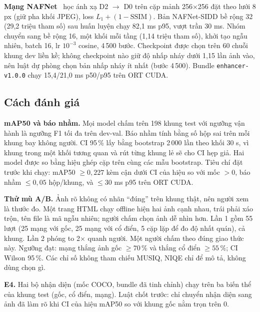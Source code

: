 \textbf{Mạng NAFNet}~\cite{nafnet} học ánh xạ D2 $\to$ D0 trên cặp mảnh 256$\times$256 đặt theo lưới 8 px (giữ pha khối JPEG), loss $L_1 + (1-\mathrm{SSIM})$. Bản NAFNet-SIDD bề rộng 32 (29,2 triệu tham số) sau huấn luyện chạy 82,1 ms p95, vượt trần 30 ms. Nhóm chuyển sang bề rộng 16, một khối mỗi tầng (1,14 triệu tham số), khởi tạo ngẫu nhiên, batch 16, lr $10^{-3}$ cosine, 4\,500 bước. Checkpoint được chọn trên 60 chuỗi khung dev liền kề; không checkpoint nào giữ độ nhấp nháy dưới 1,15 lần ảnh vào, nên luật dự phòng chọn bản nhấp nháy ít nhất (bước 4\,500). Bundle \texttt{enhancer-v1.0.0} chạy 15,4/21,0 ms p50/p95 trên ORT CUDA.

\subsection{Cách đánh giá}

\textbf{mAP50 và báo nhầm.} Mọi model chấm trên 198 khung test với ngưỡng vận hành là ngưỡng F1 tối đa trên dev-val. Báo nhầm tính bằng số hộp sai trên mỗi khung bay không người. CI 95\,\% lấy bằng bootstrap 2\,000 lần theo khối 30 s, vì khung trong một khối tương quan và rút từng khung lẻ sẽ cho CI hẹp giả. Hai model được so bằng hiệu ghép cặp trên cùng các mẫu bootstrap. Tiêu chí đặt trước khi chạy: mAP50 $\geq 0{,}227$ kèm cận dưới CI của hiệu so với mốc $>0$, báo nhầm $\leq 0{,}05$ hộp/khung, và $\leq 30$ ms p95 trên ORT CUDA.

\textbf{Thử mù A/B.} Ảnh rõ không có nhãn ``đúng'' trên khung thật, nên người xem là thước đo. Một trang HTML chạy offline hiện hai ảnh cạnh nhau, trái phải xáo trộn, tên file là mã ngẫu nhiên; người chấm chọn ảnh dễ nhìn hơn. Lần 1 gồm 55 lượt (25 mạng với gốc, 25 mạng với cổ điển, 5 cặp lặp để đo độ nhất quán), cả khung. Lần 2 phóng to 2$\times$ quanh người. Một người chấm theo đúng giao thức này. Ngưỡng đạt: mạng thắng ảnh gốc $\geq 70\,\%$ và thắng cổ điển $\geq 55\,\%$; CI Wilson 95\,\%. Các chỉ số không tham chiếu MUSIQ, NIQE chỉ để mô tả, không dùng chọn gì.

\textbf{E4.} Hai bộ nhận diện (mốc COCO, bundle đã tinh chỉnh) chạy trên ba biến thể của khung test (gốc, cổ điển, mạng). Luật chốt trước: chỉ chuyển nhận diện sang ảnh đã làm rõ khi CI của hiệu mAP50 so với khung gốc nằm trọn trên 0.
